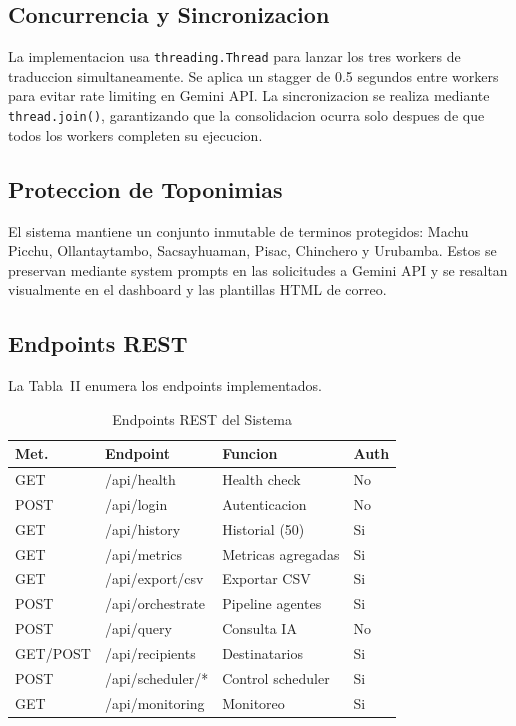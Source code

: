 \documentclass[10pt,twocolumn,a4paper]{article}
\begin{document}
\subsection{Concurrencia y Sincronizacion}

La implementacion usa \texttt{threading.Thread} para lanzar los
tres workers de traduccion simultaneamente. Se aplica un stagger
de 0.5 segundos entre workers para evitar rate limiting en Gemini
API. La sincronizacion se realiza mediante \texttt{thread.join()},
garantizando que la consolidacion ocurra solo despues de que todos
los workers completen su ejecucion.

\subsection{Proteccion de Toponimias}

El sistema mantiene un conjunto inmutable de terminos protegidos:
Machu Picchu, Ollantaytambo, Sacsayhuaman, Pisac, Chinchero y
Urubamba. Estos se preservan mediante system prompts en las
solicitudes a Gemini API y se resaltan visualmente en el dashboard
y las plantillas HTML de correo.

\subsection{Endpoints REST}

La Tabla~II enumera los endpoints implementados.

\begin{table}[t]
\caption{Endpoints REST del Sistema}
\label{tab:endpoints}
\centering
\small
\begin{tabular}{p{0.8cm}|p{2.6cm}|p{2.2cm}|p{0.7cm}}
\hline
\textbf{Met.} & \textbf{Endpoint} & \textbf{Funcion} & \textbf{Auth} \\
\hline
GET & /api/health & Health check & No \\
POST & /api/login & Autenticacion & No \\
GET & /api/history & Historial (50) & Si \\
GET & /api/metrics & Metricas agregadas & Si \\
GET & /api/export/csv & Exportar CSV & Si \\
POST & /api/orchestrate & Pipeline agentes & Si \\
POST & /api/query & Consulta IA & No \\
GET/POST & /api/recipients & Destinatarios & Si \\
POST & /api/scheduler/* & Control scheduler & Si \\
GET & /api/monitoring & Monitoreo & Si \\
\hline
\end{tabular}
\end{table}
\end{document}
